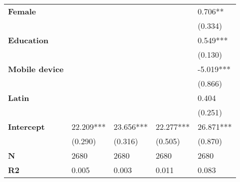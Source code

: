 \begin{tabular}{lllll}
\textbf{Female                        } &              &              &              &      0.706** \\
                               &              &              &              &      (0.334) \\
\textbf{Education                     } &              &              &              &     0.549*** \\
                               &              &              &              &      (0.130) \\
\textbf{Mobile device                 } &              &              &              &    -5.019*** \\
                               &              &              &              &      (0.866) \\
\textbf{Latin                         } &              &              &              &        0.404 \\
                               &              &              &              &      (0.251) \\
\textbf{Intercept                     } &    22.209*** &    23.656*** &    22.277*** &    26.871*** \\
                               &      (0.290) &      (0.316) &      (0.505) &      (0.870) \\
\textbf{N                             } &         2680 &         2680 &         2680 &         2680 \\
\textbf{R2                            } &        0.005 &        0.003 &        0.011 &        0.083 \\
\bottomrule
\end{tabular}
